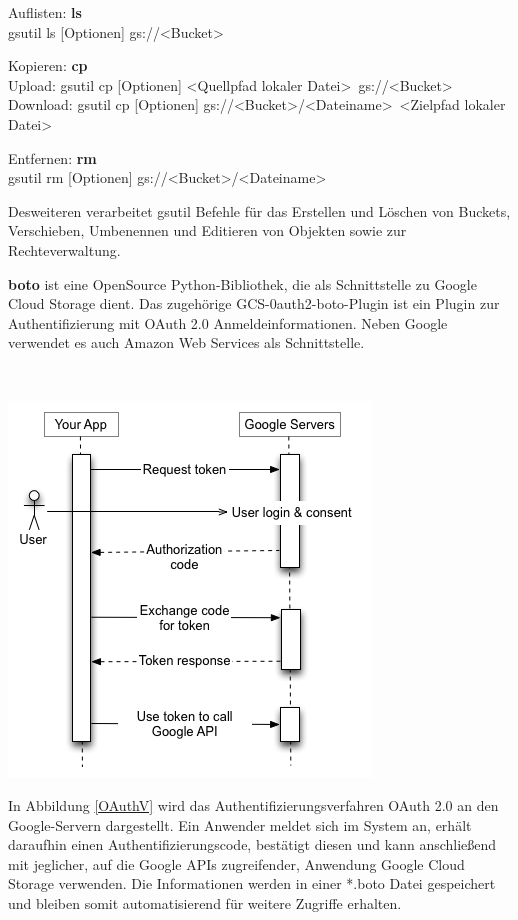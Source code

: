 \documentclass[13pt,a4paper,bibliography=totocnumbered,listof=totocnumbered]{scrartcl}
\begin{document}
\begin{compactitem}
	\item Auflisten: \textbf{ls}\\
	gsutil ls [Optionen] gs://\textless Bucket\textgreater
	\item Kopieren: \textbf{cp}\\
	Upload: gsutil cp [Optionen] \textless Quellpfad lokaler Datei\textgreater~gs://\textless Bucket\textgreater\\
	Download:  gsutil cp [Optionen] gs://\textless Bucket\textgreater/\textless Dateiname\textgreater~\textless Zielpfad lokaler Datei\textgreater
	\item Entfernen: \textbf{rm}\\
	gsutil rm [Optionen] gs://\textless Bucket\textgreater /\textless Dateiname\textgreater
\end{compactitem}

Desweiteren verarbeitet gsutil Befehle für das Erstellen und Löschen von Buckets, Verschieben, Umbenennen und Editieren von Objekten sowie zur Rechteverwaltung.

\textbf{boto} \cite{47} ist eine OpenSource Python-Bibliothek, die als Schnittstelle zu Google Cloud Storage dient. Das zugehörige GCS-0auth2-boto-Plugin ist ein Plugin zur Authentifizierung mit OAuth 2.0 Anmeldeinformationen. Neben Google verwendet es auch Amazon Web Services als Schnittstelle.

$\;$\\
\begin{minipage}{\linewidth}
	\centering
	\includegraphics[width=0.5\linewidth]{./img/OAuth.png}
	\label{OAuthV}
\end{minipage}

In Abbildung \ref{OAuthV} wird das Authentifizierungsverfahren OAuth 2.0 an den Google-Servern dargestellt. Ein Anwender meldet sich im System an, erhält daraufhin einen Authentifizierungscode, bestätigt diesen und kann anschließend mit jeglicher, auf die Google APIs zugreifender, Anwendung Google Cloud Storage verwenden. Die Informationen werden in einer *.boto Datei gespeichert und bleiben somit automatisierend für weitere Zugriffe erhalten. \cite{46}
\end{document}
